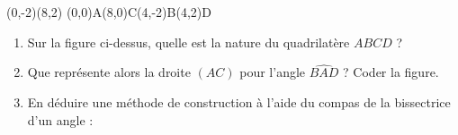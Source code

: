 \begin{center}
\pspicture(0,-2)(8,2)
    \pstGeonode[PointSymbol=none,PosAngle={135,45,-90,90}](0,0){A}(8,0){C}(4,-2){B}(4,2){D}
     
     
\endpspicture
\end{center}
\begin{enumerate}[1.]
    \item Sur la figure ci-dessus, quelle est la nature du quadrilatère $ABCD$ ?
    \item Que représente alors la droite $(AC)$ pour l'angle $\widehat{BAD}$ ? Coder la figure.
    \item En déduire une méthode de construction à l'aide du
    compas de la bissectrice d'un angle : \dotfill\\
    \null \dotfill\\
    \null \dotfill\\
    \null \dotfill\\
    \null \dotfill\\
    \null \dotfill\\
    \null \dotfill\\
    \null \dotfill\\
\end{enumerate}